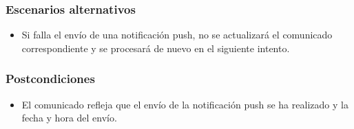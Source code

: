 \subsubsection*{Escenarios alternativos}
\begin{itemize}
    \item Si falla el envío de una notificación push, no se actualizará el comunicado correspondiente y se procesará de nuevo en el siguiente intento.
\end{itemize}

\subsubsection*{Postcondiciones}
\begin{itemize}
    \item El comunicado refleja que el envío de la notificación push se ha realizado y la fecha y hora del envío.
\end{itemize}